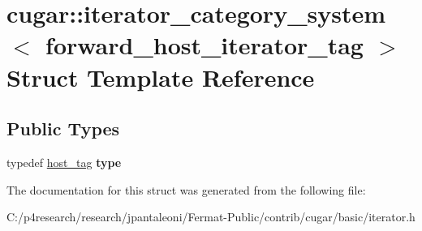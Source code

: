 \hypertarget{structcugar_1_1iterator__category__system_3_01forward__host__iterator__tag_01_4}{}\section{cugar\+:\+:iterator\+\_\+category\+\_\+system$<$ forward\+\_\+host\+\_\+iterator\+\_\+tag $>$ Struct Template Reference}
\label{structcugar_1_1iterator__category__system_3_01forward__host__iterator__tag_01_4}
\subsection*{Public Types}
\begin{DoxyCompactItemize}
\item 
\mbox{\label{structcugar_1_1iterator__category__system_3_01forward__host__iterator__tag_01_4_a2a737844bfd8ec050a33bb9c5b1730af}} 
typedef \hyperlink{structcugar_1_1host__tag}{host\+\_\+tag} {\bfseries type}
\end{DoxyCompactItemize}


The documentation for this struct was generated from the following file\+:\begin{DoxyCompactItemize}
\item 
C\+:/p4research/research/jpantaleoni/\+Fermat-\/\+Public/contrib/cugar/basic/iterator.\+h\end{DoxyCompactItemize}
